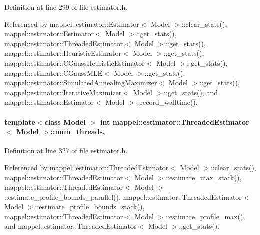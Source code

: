 Definition at line 299 of file estimator.\+h.



Referenced by mappel\+::estimator\+::\+Estimator$<$ Model $>$\+::clear\+\_\+stats(), mappel\+::estimator\+::\+Estimator$<$ Model $>$\+::get\+\_\+stats(), mappel\+::estimator\+::\+Threaded\+Estimator$<$ Model $>$\+::get\+\_\+stats(), mappel\+::estimator\+::\+Heuristic\+Estimator$<$ Model $>$\+::get\+\_\+stats(), mappel\+::estimator\+::\+C\+Gauss\+Heuristic\+Estimator$<$ Model $>$\+::get\+\_\+stats(), mappel\+::estimator\+::\+C\+Gauss\+M\+L\+E$<$ Model $>$\+::get\+\_\+stats(), mappel\+::estimator\+::\+Simulated\+Annealing\+Maximizer$<$ Model $>$\+::get\+\_\+stats(), mappel\+::estimator\+::\+Iterative\+Maximizer$<$ Model $>$\+::get\+\_\+stats(), and mappel\+::estimator\+::\+Estimator$<$ Model $>$\+::record\+\_\+walltime().

\paragraph[{\texorpdfstring{num\+\_\+threads}{num_threads}}]{\setlength{\rightskip}{0pt plus 5cm}template$<$class Model $>$ int {\bf mappel\+::estimator\+::\+Threaded\+Estimator}$<$ Model $>$\+::num\+\_\+threads\hspace{0.3cm}{\ttfamily [protected]}, {\ttfamily [inherited]}}\hypertarget{classmappel_1_1estimator_1_1ThreadedEstimator_af746a83929a7217b4084d0e10f850bc3}{}\label{classmappel_1_1estimator_1_1ThreadedEstimator_af746a83929a7217b4084d0e10f850bc3}


Definition at line 327 of file estimator.\+h.



Referenced by mappel\+::estimator\+::\+Threaded\+Estimator$<$ Model $>$\+::clear\+\_\+stats(), mappel\+::estimator\+::\+Threaded\+Estimator$<$ Model $>$\+::estimate\+\_\+max\+\_\+stack(), mappel\+::estimator\+::\+Threaded\+Estimator$<$ Model $>$\+::estimate\+\_\+profile\+\_\+bounds\+\_\+parallel(), mappel\+::estimator\+::\+Threaded\+Estimator$<$ Model $>$\+::estimate\+\_\+profile\+\_\+bounds\+\_\+stack(), mappel\+::estimator\+::\+Threaded\+Estimator$<$ Model $>$\+::estimate\+\_\+profile\+\_\+max(), and mappel\+::estimator\+::\+Threaded\+Estimator$<$ Model $>$\+::get\+\_\+stats().

